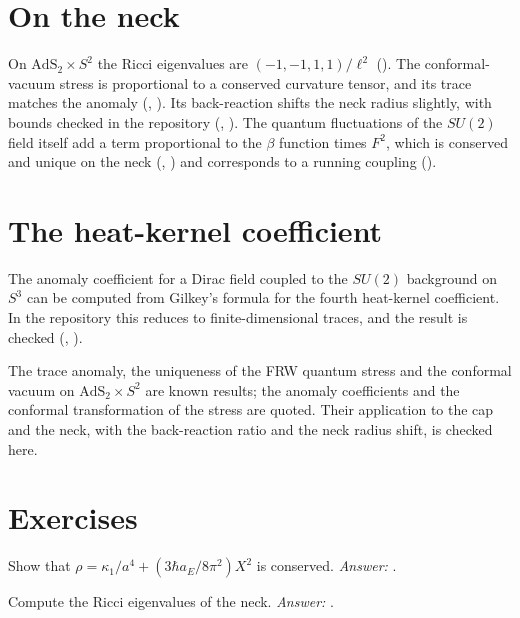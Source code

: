 \section{On the neck}

On $\mathrm{AdS}_2\times S^2$ the Ricci eigenvalues are $(-1,-1,1,1)/\ell^2$ (). The conformal-vacuum stress is proportional to a conserved curvature tensor, and its trace matches the anomaly (, ). Its back-reaction shifts the neck radius slightly, with bounds checked in the repository (, ). The quantum fluctuations of the $SU(2)$ field itself add a term proportional to the $\beta$ function times $F^2$, which is conserved and unique on the neck (, ) and corresponds to a running coupling ().

\section{The heat-kernel coefficient}

The anomaly coefficient for a Dirac field coupled to the $SU(2)$ background on $S^3$ can be computed from Gilkey's formula for the fourth heat-kernel coefficient. In the repository this reduces to finite-dimensional traces, and the result is checked (, ).

\begin{standsbox}
The trace anomaly, the uniqueness of the FRW quantum stress and the conformal vacuum on $\mathrm{AdS}_2\times S^2$ are known results; the anomaly coefficients and the conformal transformation of the stress are quoted. Their application to the cap and the neck, with the back-reaction ratio and the neck radius shift, is checked here.
\end{standsbox}

\section*{Exercises}
\begin{exercise}Show that $\rho=\kappa_1/a^4+(3\hbar a_E/8\pi^2)X^2$ is conserved. \emph{Answer:} .\end{exercise}
\begin{exercise}Compute the Ricci eigenvalues of the neck. \emph{Answer:} .\end{exercise}
